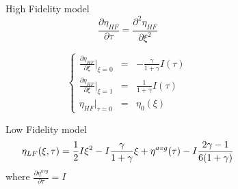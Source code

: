\documentclass[8pt]{beamer}
\begin{document}
\begin{frame}
\begin{itemize}
\end{itemize}
\vspace{-0.1in}
\begin{columns}
\begin{column}{.55\textwidth}
\begin{block}{High Fidelity model}
\vspace{-0.05in}
\begin{equation*}\label{eq:HF}
\frac{\partial\eta_{HF}}{\partial\tau} = \frac{\partial^2\eta_{HF}}{\partial\xi^2}
\end{equation*}
\vspace{-0.1in}
\begin{small}
\begin{equation*}
\left\{\begin{matrix}
\frac{\partial\eta_{HF}}{\partial\xi}|_{\xi=0} & = & -\frac{\gamma}{1+\gamma}I(\tau)\\
\frac{\partial\eta_{HF}}{\partial\xi}|_{\xi=1} & = & \frac{1}{1+\gamma}I(\tau) \nonumber\\
\eta_{HF}|_{\tau=0} 					       & =  & \eta_0(\xi)
\end{matrix}\right.
\end{equation*}
\end{small}
\vspace{-0.05in}
\end{block}
\vspace{-0.08in}
\begin{block}{Low Fidelity model}
 \vspace{-0.15in}
\begin{eqnarray*}\label{eq:LF}
\eta_{LF}(\xi,\tau) = \frac{1}{2}I\xi^2- I \frac{\gamma}{1+\gamma}\xi + {\eta}^{avg}(\tau)
			 - I\frac{2\gamma-1}{6(1+\gamma)}
	\vspace{-0.3in}		 
\end{eqnarray*}
where $\frac{\partial{\eta}^{avg}}{\partial\tau} = I$
\end{block}
\end{column}
\begin{column}{.4\textwidth}
\begin{center}
\vspace{-0.75in}
\begin{figure}[h]

\end{figure}
\end{center}
\end{column}
\end{columns}
\end{frame}
\end{document}
